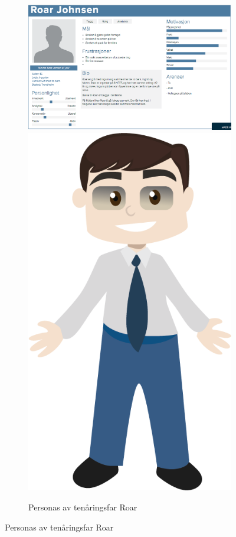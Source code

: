 \begin{figure}[H]
    \begin{figure}
    \includegraphics[scale=0.3]{images/personas/personasRoar}
    \includegraphics[scale=0.25]{images/personas/roar}
   
    \caption{Personas av tenåringsfar Roar}
    \label{fig:personasRoar}
    \end{figure}
\end{figure}

